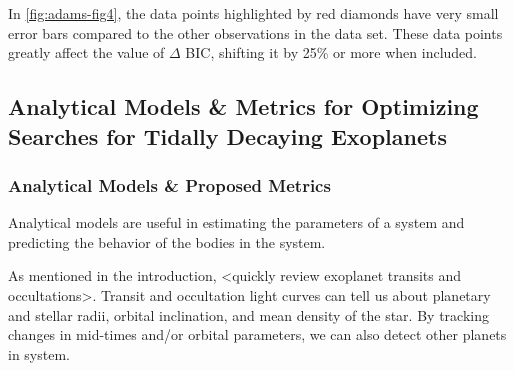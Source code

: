 \documentclass[oneside,12pt]{amsart}
\numberwithin{page}{section}
\begin{document}
In \ref{fig:adams-fig4}, the data points highlighted by red diamonds have very small error bars compared to the other observations in the data set. These data points greatly affect the value of $\Delta$ BIC, shifting it by 25\% or more when included.



\clearpage


\subsection{Analytical Models \& Metrics for Optimizing Searches for Tidally Decaying Exoplanets}

\subsubsection{Analytical Models \& Proposed Metrics}

Analytical models are useful in estimating the parameters of a system and predicting the behavior of the bodies in the system. 

As mentioned in the introduction, <quickly review exoplanet transits and occultations>. Transit and occultation light curves can tell us about planetary and stellar radii, orbital inclination, and mean density of the star. By tracking changes in mid-times and/or orbital parameters, we can also detect other planets in system.
\end{document}
